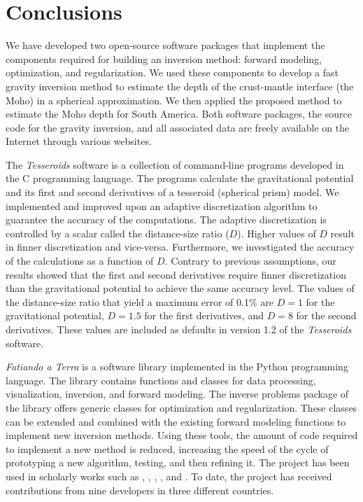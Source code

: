 \chapter{Conclusions}


We have developed two open-source software packages that implement the
components required for building an inversion method: forward modeling,
optimization, and regularization.
We used these components to develop a fast gravity inversion method to estimate
the depth of the crust-mantle interface (the Moho) in a spherical
approximation.
We then applied the proposed method to estimate the Moho depth for South
America.
Both software packages, the source code for the gravity inversion, and all
associated data are freely available on the Internet through various websites.

The \textit{Tesseroids} software is a collection of command-line
programs developed in the C programming language.
The programs calculate the gravitational potential and its first and second
derivatives of a tesseroid (spherical prism) model.
We implemented and improved upon an adaptive discretization algorithm to
guarantee the accuracy of the computations.
The adaptive discretization is controlled by a scalar called the distance-size
ratio ($D$).
Higher values of $D$ result in finner discretization and vice-versa.
Furthermore, we investigated the accuracy of the calculations as a function of
$D$.
Contrary to previous assumptions, our results showed that the first and second
derivatives require finner discretization than the gravitational potential to
achieve the same accuracy level.
The values of the distance-size ratio that yield a maximum error of 0.1\%
are $D = 1$ for the gravitational potential, $D = 1.5$ for the first
derivatives, and $D = 8$ for the second derivatives.
These values are included as defaults in version 1.2 of the \textit{Tesseroids}
software.

\textit{Fatiando a Terra} is a software library implemented in the Python
programming language.
The library contains functions and classes for data processing, visualization,
inversion, and forward modeling.
The inverse problems package of the library offers generic classes for
optimization and regularization.
These classes can be extended and combined with the existing forward modeling
functions to implement new inversion methods.
Using these tools, the amount of code required to implement a new method is
reduced, increasing the speed of the cycle of prototyping a new algorithm,
testing, and then refining it.
The project has been used in scholarly works such as
\citet{carlos2014}, \citet{hidalgo-gato2015a}, \citet{niccoli2015},
\citet{oliveirajr.2015}, and \citet{bassett2016}.
To date, the project has received contributions from nine developers in three
different countries.

